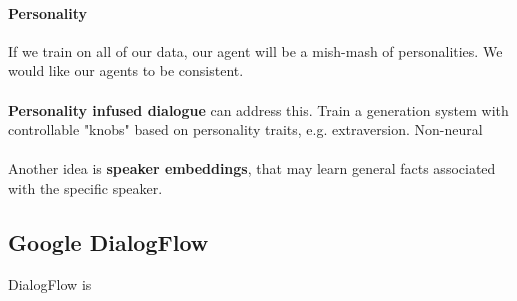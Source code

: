 \documentclass[10pt]{report}
\begin{document}
\paragraph{Personality} If we train on all of our data, our agent will be a mish-mash of personalities. We would like our agents to be consistent.\\\\
\textbf{Personality infused dialogue} can address this. Train a generation system with controllable "knobs" based on personality traits, e.g. extraversion. Non-neural\\\\ %
Another idea is \textbf{speaker embeddings}, that may learn general facts associated with the specific speaker.
\subsection{Google DialogFlow} DialogFlow is %
\end{document}
